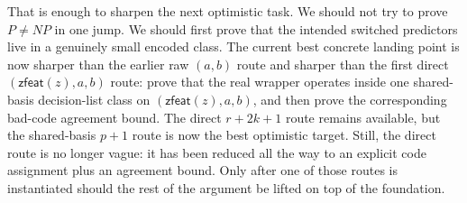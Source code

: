 \documentclass[11pt]{article}
\theoremstyle{remark}
\begin{document}
That is enough to sharpen the next optimistic task.  We should not try to prove
\(P \neq NP\) in one jump.  We should first prove that the intended switched
predictors live in a genuinely small encoded class.  The current best concrete
landing point is now sharper than the earlier raw \((a,b)\) route and sharper
than the first direct \((\mathsf{zfeat}(z),a,b)\) route: prove that the real
wrapper operates inside one shared-basis decision-list class on
\((\mathsf{zfeat}(z),a,b)\), and then prove the corresponding bad-code
agreement bound.  The direct \(r+2k+1\) route remains available, but the
shared-basis \(p+1\) route is now the best optimistic target.  Still, the
direct route is no longer vague: it has been reduced all the way to an explicit
code assignment plus an agreement bound.  Only after one of those routes is
instantiated should the rest of the argument be lifted on top of the
foundation.
\end{document}
